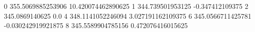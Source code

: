 0 355.5069885253906 10.420074462890625
1 344.739501953125 -0.347412109375
2 345.0869140625 0.0
4 348.1141052246094 3.027191162109375
6 345.0566711425781 -0.030242919921875
8 345.5589904785156 0.472076416015625
